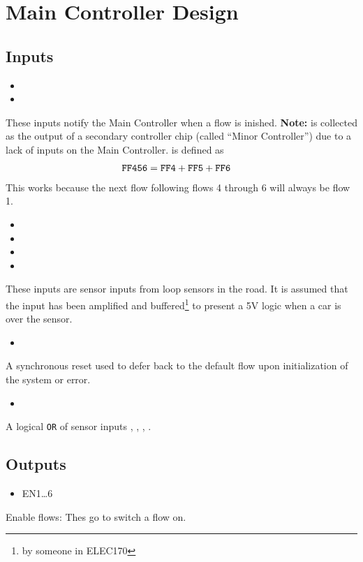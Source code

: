 \section{Main Controller Design}
\subsection{Inputs}
\begin{itemize}
  \item {}
  \item {}
\end{itemize}
These inputs notify the Main Controller when a flow is inished. \textbf{Note:}
 is collected as the output of a secondary controller chip (called
``Minor Controller'') due to a lack of inputs on the Main Controller. 
is defined as
\begin{align}\texttt{FF456} &= \texttt{FF4} + \texttt{FF5} + \texttt{FF6}\end{align}
This works because the next flow following flows 4 through 6 will always be flow
1.

\begin{itemize}
  \item \AR
  \item \B
  \item \CR
  \item \D
\end{itemize}
These inputs are sensor inputs from loop sensors in the road. It is assumed that
the input has been amplified and buffered\footnote{by someone in ELEC170} to
present a 5V logic \HIGH when a car is over the sensor.
\begin{itemize}
  \item \nReset
\end{itemize}
A synchronous reset used to defer back to the default flow upon initialization
of the system or error.
\begin{itemize}
  \item \nS
\end{itemize}
A logical \texttt{OR} of sensor inputs \AR, \B, \CR, \D.

\subsection{Outputs}
\begin{itemize}
  \item EN{1\ldots 6}
\end{itemize}
Enable flows: Thes go \HIGH to switch a flow on.

